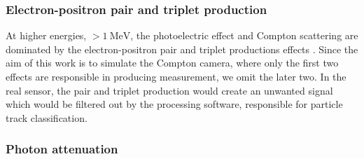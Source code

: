 \documentclass[a4paper,12pt,titlepage, twoside]{article}
\newcommand{\unit}[2]{$#1~\ensuremath{\mathrm{#2}}$}
\begin{document}


\subsubsection{Electron-positron pair and triplet production}

At higher energies, \unit{>1}{MeV}, the photoelectric effect and Compton scattering are dominated by the electron-positron pair and triplet productions effects \cite{hubbell1980pair}.
Since the aim of this work is to simulate the Compton camera, where only the first two effects are responsible in producing measurement, we omit the later two.
In the real sensor, the pair and triplet production would create an unwanted signal which would be filtered out by the processing software, responsible for particle track classification.



\subsubsection{Photon attenuation}
\end{document}

